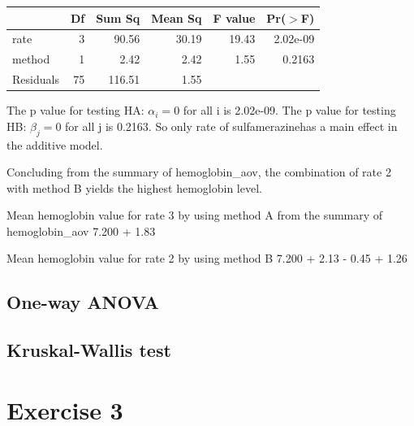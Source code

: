 \documentclass{article}
\begin{document}
\begin{table}[ht]
\centering
\begin{tabular}{lrrrrr}
  \hline
 & Df & Sum Sq & Mean Sq & F value & Pr($>$F) \\ 
  \hline
rate & 3 & 90.56 & 30.19 & 19.43 & 2.02e-09 \\ 
  method & 1 & 2.42 & 2.42 & 1.55 & 0.2163 \\ 
  Residuals & 75 & 116.51 & 1.55 &  &  \\ 
   \hline
\end{tabular}
\end{table}

The p value for testing HA: $\alpha_i = 0$ for all i is 2.02e-09.
The p value for testing HB: $\beta_j = 0$ for all j is 0.2163.
So only rate of sulfamerazinehas a main effect in the additive model.

Concluding from the summary of hemoglobin\_aov, the combination of rate 2 with method B yields the highest hemoglobin level.

Mean hemoglobin value for rate 3 by using method A from the summary of hemoglobin\_aov 7.200 + 1.83

Mean hemoglobin value for rate 2 by using method B 7.200 + 2.13 - 0.45 + 1.26

\subsection{One-way ANOVA}

\subsection{Kruskal-Wallis test}


\section{Exercise 3}




\end{document}
